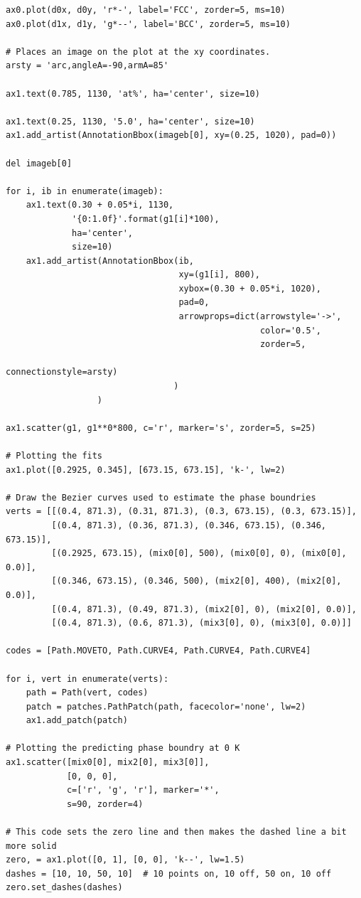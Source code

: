 \documentclass[number, sort&compress, review, 12pt]{elsarticle}
\begin{document}
\begin{verbatim}
ax0.plot(d0x, d0y, 'r*-', label='FCC', zorder=5, ms=10)
ax0.plot(d1x, d1y, 'g*--', label='BCC', zorder=5, ms=10)

# Places an image on the plot at the xy coordinates.
arsty = 'arc,angleA=-90,armA=85'

ax1.text(0.785, 1130, 'at%', ha='center', size=10)

ax1.text(0.25, 1130, '5.0', ha='center', size=10)
ax1.add_artist(AnnotationBbox(imageb[0], xy=(0.25, 1020), pad=0))

del imageb[0]

for i, ib in enumerate(imageb):
    ax1.text(0.30 + 0.05*i, 1130,
             '{0:1.0f}'.format(g1[i]*100),
             ha='center',
             size=10)
    ax1.add_artist(AnnotationBbox(ib,
                                  xy=(g1[i], 800),
                                  xybox=(0.30 + 0.05*i, 1020),
                                  pad=0,
                                  arrowprops=dict(arrowstyle='->',
                                                  color='0.5',
                                                  zorder=5,
                                                  connectionstyle=arsty)
                                 )
                  )

ax1.scatter(g1, g1**0*800, c='r', marker='s', zorder=5, s=25)

# Plotting the fits
ax1.plot([0.2925, 0.345], [673.15, 673.15], 'k-', lw=2)

# Draw the Bezier curves used to estimate the phase boundries
verts = [[(0.4, 871.3), (0.31, 871.3), (0.3, 673.15), (0.3, 673.15)],
         [(0.4, 871.3), (0.36, 871.3), (0.346, 673.15), (0.346, 673.15)],
         [(0.2925, 673.15), (mix0[0], 500), (mix0[0], 0), (mix0[0], 0.0)],
         [(0.346, 673.15), (0.346, 500), (mix2[0], 400), (mix2[0], 0.0)],
         [(0.4, 871.3), (0.49, 871.3), (mix2[0], 0), (mix2[0], 0.0)],
         [(0.4, 871.3), (0.6, 871.3), (mix3[0], 0), (mix3[0], 0.0)]]

codes = [Path.MOVETO, Path.CURVE4, Path.CURVE4, Path.CURVE4]

for i, vert in enumerate(verts):
    path = Path(vert, codes)
    patch = patches.PathPatch(path, facecolor='none', lw=2)
    ax1.add_patch(patch)

# Plotting the predicting phase boundry at 0 K
ax1.scatter([mix0[0], mix2[0], mix3[0]],
            [0, 0, 0],
            c=['r', 'g', 'r'], marker='*',
            s=90, zorder=4)

# This code sets the zero line and then makes the dashed line a bit more solid
zero, = ax1.plot([0, 1], [0, 0], 'k--', lw=1.5)
dashes = [10, 10, 50, 10]  # 10 points on, 10 off, 50 on, 10 off
zero.set_dashes(dashes)


\end{verbatim}
\end{document}
